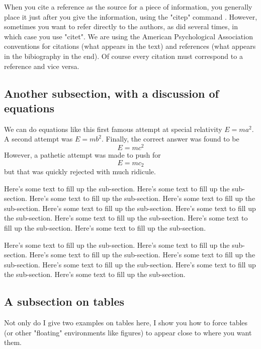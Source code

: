 \documentclass[11pt]{ucscthesisbs}
\begin{document}
When you cite a reference as the source for a piece of information,
you generally place it just after you give the information, using the "citep"
command \citep{awwzml06}.  However, sometimes you want to refer directly to 
the authors, as \citet{agcs89} did several times, in which case you use "citet".
We are using the American Psychological Association conventions for citations
(what appears in the text) and references (what appears in the bibiography in
the end).  Of course every citation must correspond to a reference and vice versa.

\subsection{Another subsection, with a discussion of equations}\label{subsection_equations}

We can do equations like this first famous attempt
at special relativity $E=ma^2$.  A second attempt
was $E=mb^2$.  Finally, the correct answer was found
to be
\begin{equation}
E=mc^2
\end{equation}
However, a pathetic attempt was made to push
for
\begin{equation}
E=mc_2
\end{equation}
\noindent but that was quickly rejected with much ridicule.

Here's some text to fill up the sub-section.
Here's some text to fill up the sub-section.
Here's some text to fill up the sub-section.
Here's some text to fill up the sub-section.
Here's some text to fill up the sub-section.
Here's some text to fill up the sub-section.
Here's some text to fill up the sub-section.
Here's some text to fill up the sub-section.
Here's some text to fill up the sub-section.

Here's some text to fill up the sub-section.
Here's some text to fill up the sub-section.
Here's some text to fill up the sub-section.
Here's some text to fill up the sub-section.
Here's some text to fill up the sub-section.
Here's some text to fill up the sub-section.
Here's some text to fill up the sub-section.


\subsection{A subsection on tables}\label{tables}

Not only do I give two examples on tables here, I show you how to force tables (or other "floating" environments like figures) to appear close to where you want them.
\end{document}
